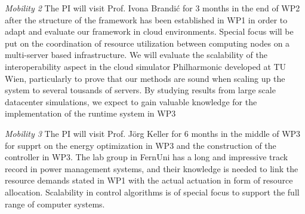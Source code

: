 \documentclass{article}
\begin{document}
\textit{Mobility 2} The PI will visit Prof. Ivona Brandi\'{c} for 3 months in the end of WP2 after the structure of the framework has been established in WP1 in order to adapt and evaluate our framework in cloud environments. 
Special focus will be put on the coordination of resource utilization between computing nodes on a multi-server based infrastructure.
We will evaluate the scalability of the interoperability aspect in the cloud simulator Philharmonic developed at TU Wien, particularly to prove that our methods are sound when scaling up the system to several tousands of servers.
By studying results from large scale datacenter simulations, we expect to gain valuable knowledge for the implementation of the runtime system in WP3 \smallskip

\textit{Mobility 3} The PI will visit Prof. J\"{o}rg Keller for 6 months in the middle of WP3 for supprt on the energy optimization in WP3 and the construction of the controller in WP3.
The lab group in FernUni has a long and impressive track record in power management systems, 
and their knowledge is needed to link the resource demands stated in WP1 with the actual actuation in form of resource allocation.
Scalability in control algorithms is of special focus to support the full range of computer systems.


{\footnotesize
}

\end{document}

